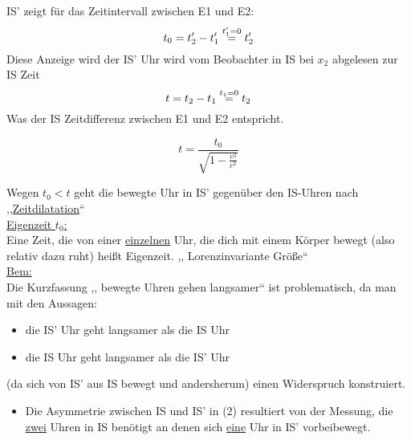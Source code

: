 \documentclass[titlepage,12pt,a4paper,ngerman]{report}
\newcommand{\frbox}[2]{\begin{tcolorbox}[colback=white,colframe=red!75!black,fonttitle=\bfseries,title=#1]#2\end{tcolorbox}} %
\begin{document}
{\begin{equation*}
\end{equation*}
IS' zeigt für das Zeitintervall zwischen E1 und E2:
$$ t_0 = t_2' - t_1' \buildrel t_1' = 0 \over = t_2' $$
Diese Anzeige wird der IS' Uhr wird vom Beobachter in IS bei $ x_2 $ abgelesen zur IS Zeit
$$ t = t_2 - t_1 \buildrel t_1 = 0 \over = t_2 $$
Was der IS Zeitdifferenz zwischen E1 und E2 entspricht.
\frbox{Zeitdilatation}{
\begin{equation*}
t = \frac{t_0}{\sqrt{1-\frac{v^2}{c^2}}} \tag{2}
\end{equation*}}
Wegen $ t_0 < t $ geht die bewegte Uhr in IS' gegenüber den IS-Uhren nach ,,\underline{Zeitdilatation}``\\[5pt]
\underline{Eigenzeit $ t_0 $:}\\
Eine Zeit, die von einer \underline{einzelnen} Uhr, die dich mit einem Körper bewegt (also relativ dazu ruht) heißt Eigenzeit. ,, Lorenzinvariante Größe``\\[5pt]
\underline{Bem:}\\
Die Kurzfassung ,, bewegte Uhren gehen langsamer`` ist problematisch, da man mit den Aussagen:
\begin{itemize}
	\item die IS' Uhr geht langsamer als die IS Uhr
	\item die IS Uhr geht langsamer als die IS' Uhr
\end{itemize}
(da sich von IS' aus IS bewegt und andersherum) einen Widerspruch konstruiert.
\begin{itemize}
	\item Die Asymmetrie zwischen IS und IS' in (2) resultiert von der Messung, die \underline{zwei} Uhren in IS benötigt an denen sich \underline{eine} Uhr in IS' vorbeibewegt.
\end{itemize} 
}
\end{document}
